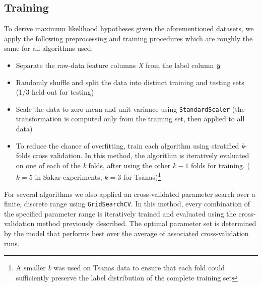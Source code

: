 \documentclass[12pt]{article}
\begin{document}
\subsection{Training}
To derive maximum likelihood hypotheses given the aforementioned datasets, we apply the following preprocessing and training procedures which are roughly the same for all algorithms used:
\begin{itemize}
  \item Separate the raw-data feature columns \textit{X} from the label column \textbf{\textit{y}}
  \item Randomly shuffle and split the data into distinct training and testing sets (1/3 held out for testing)
  \item Scale the data to zero mean and unit variance using \texttt{StandardScaler} (the transformation is computed only from the training set, then applied to all data)
  \item To reduce the chance of overfitting, train each algorithm using stratified \textit{k}-folds cross validation. In this method, the algorithm is iteratively evaluated on one of each of the \textit{k} folds, after using the other $k-1$ folds for training. ($k=5$ in Sakar experiments, $k=3$ for Tsanas)\footnote{A smaller \textit{k} was used on Tsanas data to ensure that each fold could sufficiently preserve the label distribution of the complete training set}
\end{itemize}

For several algorithms we also applied an cross-validated parameter search over a finite, discrete range using \texttt{GridSearchCV}. In this method, every combination of the specified parameter range is iteratively trained and evaluated using the cross-validation method previously described. The optimal parameter set is determined by the model that performs best over the average of associated cross-validation runs.
\end{document}
